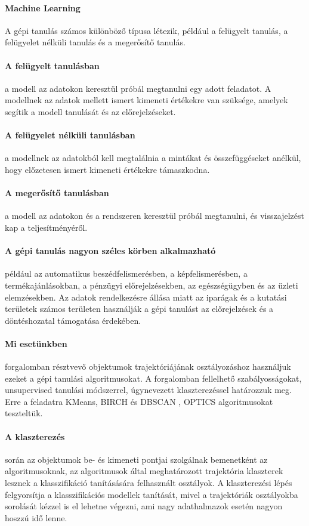 \documentclass[12pt,a4paper]{article}
\begin{document}
\paragraph{Machine Learning} A gépi tanulás számos különböző típusa létezik, például a felügyelt tanulás, a felügyelet nélküli tanulás és a megerősítő tanulás. 
\paragraph{A felügyelt tanulásban} a modell az adatokon keresztül próbál megtanulni egy adott feladatot. A modellnek az adatok mellett ismert kimeneti értékekre van szüksége, amelyek segítik a modell tanulását és az előrejelzéseket. 
\paragraph{A felügyelet nélküli tanulásban} a modellnek az adatokból kell megtalálnia a mintákat és összefüggéseket anélkül, hogy előzetesen ismert kimeneti értékekre támaszkodna. 
\paragraph{A megerősítő tanulásban} a modell az adatokon és a rendszeren keresztül próbál megtanulni, és visszajelzést kap a teljesítményéről.
\paragraph{A gépi tanulás nagyon széles körben alkalmazható} például az automatikus beszédfelismerésben, a képfelismerésben, a termékajánlásokban, a pénzügyi előrejelzésekben, az egészségügyben és az üzleti elemzésekben. Az adatok rendelkezésre állása miatt az iparágak és a kutatási területek számos területen használják a gépi tanulást az előrejelzések és a döntéshozatal támogatása érdekében.
\paragraph{Mi esetünkben} forgalomban résztvevő objektumok trajektóriájának osztályozáshoz használjuk ezeket a gépi tanulási algoritmusokat.
A forgalomban fellelhető szabályosságokat, unsupervised tanulási módszerrel, úgynevezett klaszterezéssel határozzuk meg. Erre a feladatra KMeans, BIRCH \cite{10.1145/233269.233324} és DBSCAN \cite{10.5555/3001460.3001507}\cite{10.1145/3068335}, OPTICS \cite{10.1145/304181.304187} algoritmusokat teszteltük.
\paragraph{A klaszterezés} során az objektumok be- és kimeneti pontjai szolgálnak bemenetként az algoritmusoknak, az algoritmusok által meghatározott trajektória klaszterek lesznek a klasszifikáció tanításására felhasznált osztályok.
A klaszterezési lépés felgyorsítja a klasszifikációs modellek tanítását, mivel a trajektóriák osztályokba sorolását kézzel is el lehetne végezni, ami nagy adathalmazok esetén nagyon hoszzú idő lenne.
\end{document}
